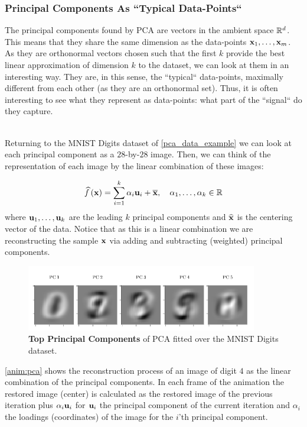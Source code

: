 \subsubsection{Principal Components As ``Typical Data-Points``}
The principal components found by PCA are vectors in the ambient space $\mathbb{R}^d$. This means that they share the same dimension as the data-points $\mathbf{x}_1,\ldots, \mathbf{x}_m$. As they are orthonormal vectors chosen such that the first $k$ provide the best linear approximation of dimension $k$ to the dataset, we can look at them in an interesting way. They are, in this sense, the ``typical`` data-points, maximally different from each other (as they are an orthonormal set). Thus, it is often interesting to see what they represent as data-points: what part of the ``signal`` do they capture.

~\\Returning to the MNIST Digits dataset of \autoref{pca_data_example} we can look at each principal component as a $28$-by-$28$ image. Then, we can think of the representation of each image by the linear combination of these images:

$$ \widehat{f}\left(\mathbf{x}\right) = \sum_{i=1}^k \alpha_i \mathbf{u}_i + \overline{\mathbf{x}}, \quad \alpha_1,\ldots,\alpha_k\in\mathbb{R} $$
where $\mathbf{u}_1,\ldots,\mathbf{u}_k$ are the leading $k$ principal components and $\widehat{\mathbf{x}}$ is the centering vector of the data. Notice that as this is a linear combination we are reconstructing the sample $\mathbf{x}$ via adding and subtracting (weighted) principal components.

\begin{figure}[h!]
	\centering
	\includegraphics[width=0.9\textwidth]{chapters/unsupervised.learning/figures/pca_pcs_Digit.png}
	\caption{\textbf{Top Principal Components} of PCA fitted over the MNIST Digits dataset. \GitChapterSevelExamplesPCA}\label{pca_pcs}
\end{figure}

\autoref{anim:pca} shows the reconstruction process of an image of digit $4$ as the linear combination of the principal components. In each frame of the animation the restored image (center) is calculated as the restored image of the previous iteration plus $\alpha_i \mathbf{u}_i$ for $\mathbf{u}_i$ the principal component of the current iteration and $\alpha_i$ the loadings (coordinates) of the image for the $i$'th principal component.

